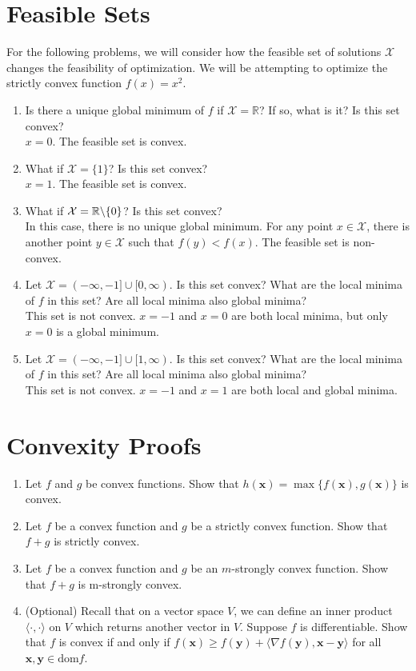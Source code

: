 \documentclass{article}
\begin{document}
\section{Feasible Sets}
For the following problems, we will consider how the feasible set of solutions $\mathcal{X}$ changes the feasibility of optimization. We will be attempting to optimize the strictly convex function $f(x) = x^2$.
\begin{enumerate}[label=\arabic*.]
\item Is there a unique global minimum of $f$ if $\mathcal{X} = \mathbb{R}$? If so, what is it? Is this set convex? \\
{\color{blue} $x = 0$. The feasible set is convex.}
\item What if $\mathcal{X} = \{ 1\}$? Is this set convex? \\
{\color{blue} $x = 1$. The feasible set is convex.}
\item What if $\mathcal{X} = \mathbb{R} \char`\\ \{ 0 \}$? Is this set convex? \\
{\color{blue} In this case, there is no unique global minimum. For any point $x \in \mathcal{X}$, there is another point $y \in \mathcal{X}$ such that $f(y) < f(x)$. The feasible set is non-convex.}
\item Let $\mathcal{X} = (-\infty, -1] \cup [0, \infty )$. Is this set convex? What are the local minima of $f$ in this set? Are all local minima also global minima? \\
{\color{blue} This set is not convex. $x = -1$ and $x = 0$ are both local minima, but only $x = 0$ is a global minimum.}
\item Let $\mathcal{X} = (-\infty, -1] \cup [1, \infty )$. Is this set convex? What are the local minima of $f$ in this set? Are all local minima also global minima? \\
{\color{blue} This set is not convex. $x = -1$ and $x = 1$ are both local and global minima.}
\end{enumerate}

\section{Convexity Proofs}
\begin{enumerate}[label=\arabic*.]
\item Let $f$ and $g$ be convex functions. Show that $h(\mathbf{x}) = \max \{f(\mathbf{x}), g(\mathbf{x})\}$ is convex.
\item Let $f$ be a convex function and $g$ be a strictly convex function. Show that $f + g$ is strictly convex.
\item Let $f$ be a convex function and $g$ be an $m$-strongly convex function. Show that $f + g$ is m-strongly convex.
\item (Optional) Recall that on a vector space $V$, we can define an inner product $\langle\cdot, \cdot\rangle$ on $V$ which returns another vector in $V$. Suppose $f$ is differentiable. Show that $f$ is convex if and only if $f(\mathbf{x}) \geq f(\mathbf{y}) + \langle\nabla f(\mathbf{y}), \mathbf{x - y}\rangle$ for all $\mathbf{x, y} \in \text{dom}f$.
\end{enumerate}
\end{document}
